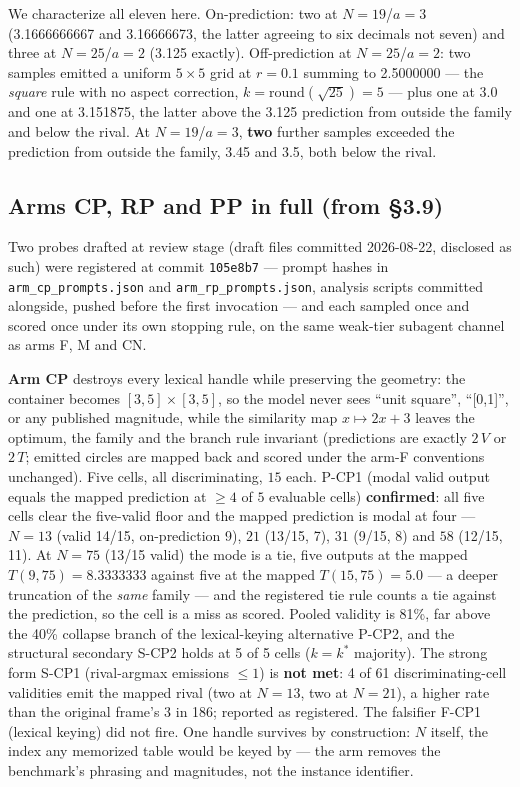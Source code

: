 We characterize all eleven here. On-prediction: two
at $N = 19$/$a = 3$ (3.1666666667 and 3.16666673, the latter agreeing to six decimals not seven) and
three at $N = 25$/$a = 2$ (3.125 exactly). Off-prediction at $N = 25$/$a = 2$: two samples emitted a
uniform $5 \times 5$ grid at $r = 0.1$ summing to 2.5000000 --- the \emph{square} rule with no aspect correction,
$k = \mathrm{round}(\sqrt{25}) = 5$ --- plus one at 3.0 and one at 3.151875, the latter above the 3.125 prediction from outside the family and below the rival. At $N = 19$/$a = 3$, \textbf{two} further samples
exceeded the prediction from outside the family, 3.45 and 3.5, both below the rival.

\subsection{Arms CP, RP and PP in full (from \S3.9)}

Two probes drafted at review stage (draft files committed 2026-08-22, disclosed as such)
were registered at commit \texttt{105e8b7} --- prompt hashes in
\texttt{arm\_cp\_prompts.json} and \texttt{arm\_rp\_prompts.json}, analysis scripts
committed alongside, pushed before the first invocation --- and each sampled once and
scored once under its own stopping rule, on the same weak-tier subagent channel as arms
F, M and CN.

\textbf{Arm CP} destroys every lexical handle while preserving the geometry: the container
becomes $[3,5] \times [3,5]$, so the model never sees ``unit square'', ``[0,1]'', or any
published magnitude, while the similarity map $x \mapsto 2x + 3$ leaves the optimum, the
family and the branch rule invariant (predictions are exactly $2\,V$ or $2\,T$; emitted
circles are mapped back and scored under the arm-F conventions unchanged). Five cells,
all discriminating, $15$ each. P-CP1 (modal valid output equals the mapped prediction at
$\ge 4$ of $5$ evaluable cells) \textbf{confirmed}: all five cells clear the five-valid
floor and the mapped prediction is modal at four --- $N = 13$ (valid 14/15,
on-prediction 9), $21$ (13/15, 7), $31$ (9/15, 8) and $58$ (12/15, 11). At $N = 75$
(13/15 valid) the mode is a tie, five outputs at the mapped $T(9,75) = 8.3333333$ against
five at the mapped $T(15,75) = 5.0$ --- a deeper truncation of the \emph{same} family ---
and the registered tie rule counts a tie against the prediction, so the cell is a miss as
scored. Pooled validity is 81\%, far above the 40\% collapse branch of the lexical-keying
alternative P-CP2, and the structural secondary S-CP2 holds at 5 of 5 cells ($k = k^*$
majority). The strong form S-CP1 (rival-argmax emissions $\le 1$) is \textbf{not met}:
4 of 61 discriminating-cell validities emit the mapped rival (two at $N = 13$, two at
$N = 21$), a higher rate than the original frame's 3 in 186; reported as registered.
The falsifier F-CP1 (lexical keying) did not fire. One handle survives by construction:
$N$ itself, the index any memorized table would be keyed by --- the arm removes the
benchmark's phrasing and magnitudes, not the instance identifier.

